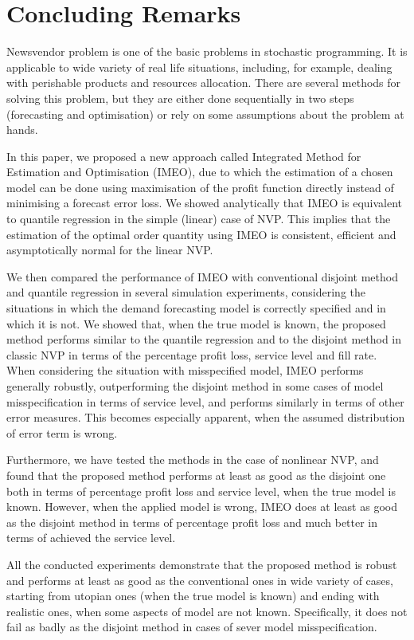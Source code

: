 \documentclass[a4paper,11pt]{article}
\begin{document}
\section{Concluding Remarks} \label{se:end}

Newsvendor problem is one of the basic problems in stochastic programming. It is applicable to wide variety of real life situations, including, for example, dealing with perishable products and resources allocation. There are several methods for solving this problem, but they are either done sequentially in two steps (forecasting and optimisation) or rely on some assumptions about the problem at hands.

In this paper, we proposed a new approach called Integrated Method for Estimation and Optimisation (IMEO), due to which the estimation of a chosen model can be done using maximisation of the profit function directly instead of minimising a forecast error loss. We showed analytically that IMEO is equivalent to quantile regression in the simple (linear) case of NVP. This implies that the estimation of the optimal order quantity using IMEO is consistent, efficient and asymptotically normal for the linear NVP.

We then compared the performance of IMEO with conventional disjoint method and quantile regression in several simulation experiments, considering the situations in which the demand forecasting model is correctly specified and in which it is not. We showed that, when the true model is known, the proposed method performs similar to the quantile regression and to the disjoint method in classic NVP in terms of the percentage profit loss, service level and fill rate. When considering the situation with misspecified model, IMEO performs generally robustly, outperforming the disjoint method in some cases of model misspecification in terms of service level, and performs similarly in terms of other error measures. This becomes especially apparent, when the assumed distribution of error term is wrong.

Furthermore, we have tested the methods in the case of nonlinear NVP, and found that the proposed method performs at least as good as the disjoint one both in terms of percentage profit loss and service level, when the true model is known. However, when the applied model is wrong, IMEO does at least as good as the disjoint method in terms of percentage profit loss and much better in terms of achieved the service level.

All the conducted experiments demonstrate that the proposed method is robust and performs at least as good as the conventional ones in wide variety of cases, starting from utopian ones (when the true model is known) and ending with realistic ones, when some aspects of model are not known. Specifically, it does not fail as badly as the disjoint method in cases of sever model misspecification.
\end{document}
